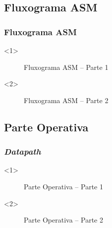 \documentclass{beamer}
\begin{document}
    \subsection{Fluxograma ASM}
    \begin{frame}
        \frametitle{Fluxograma ASM}

        \begin{onlyenv}<1>
            \begin{figure}[h]
                \centering
                \caption{\label{img:asm-1} Fluxograma ASM – Parte 1}
            \end{figure}
        \end{onlyenv}

        \begin{onlyenv}<2>
          \begin{figure}[h]
            \centering
            \caption{\label{img:asm-2} Fluxograma ASM – Parte 2}
          \end{figure}
        \end{onlyenv}
    \end{frame}

    \subsection{Parte Operativa}
    \begin{frame}
        \frametitle{\textit{Datapath}}
        \begin{onlyenv}<1>
            \begin{figure}[h]
                \centering
                \caption{\label{img:po-1} Parte Operativa – Parte 1}
            \end{figure}
        \end{onlyenv}

        \begin{onlyenv}<2>
          \begin{figure}[h]
            \centering
            \caption{\label{img:po-2} Parte Operativa – Parte 2}
          \end{figure}
        \end{onlyenv}
    \end{frame}
\end{document}
